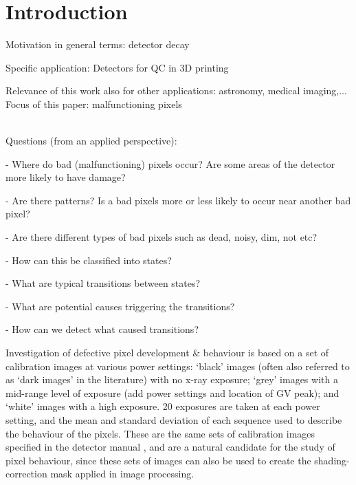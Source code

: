 \documentclass[../../IO-Pixels.tex]{subfiles}
\begin{document}
\section{Introduction}

\begin{outline}
Motivation in general terms: detector decay

Specific application: Detectors for QC in 3D printing 

Relevance of this work also for other applications: astronomy, medical imaging,...
\\

Focus of this paper: malfunctioning pixels

\\
Questions (from an applied perspective):

- Where do bad (malfunctioning) pixels occur? Are some areas of the detector more likely to have damage?

- Are there patterns? Is a bad pixels more or less likely to occur near another bad pixel?

- Are there different types of bad pixels such as dead, noisy, dim, not etc?

- How can this be classified into states?

- What are typical transitions between states? 

- What are potential causes triggering the transitions? 

- How can we detect what caused transitions?
\end{outline}


Investigation of defective pixel development \& behaviour is based on a set of calibration images at various power settings: `black' images (often also referred to as `dark images' in the literature) with no x-ray exposure; `grey' images with a mid-range level of exposure (add power settings and location of GV peak); and `white' images with a high exposure. 20 exposures are taken at each power setting, and the mean and standard deviation of each sequence used to describe the behaviour of the pixels. These are the same sets of calibration images specified in the detector manual , and are a natural candidate for the study of pixel behaviour, since these sets of images can also be used to create the shading-correction mask applied in image processing. 
\end{document}
